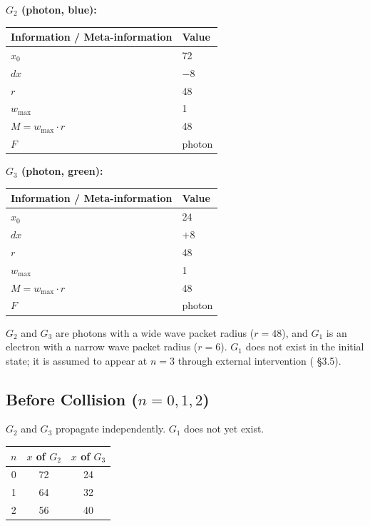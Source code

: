 \documentclass[12pt,a4paper]{article}
\begin{document}
\textbf{$G_2$ (photon, blue):}

\begin{table}[h]
\centering
\begin{tabular}{@{}ll@{}}
\toprule
Information / Meta-information & Value \\
\midrule
$x_0$ & 72 \\
$dx$ & $-8$ \\
$r$ & 48 \\
$w_{\max}$ & 1 \\
$M = w_{\max} \cdot r$ & 48 \\
$F$ & photon \\
\bottomrule
\end{tabular}
\end{table}

\textbf{$G_3$ (photon, green):}

\begin{table}[h]
\centering
\begin{tabular}{@{}ll@{}}
\toprule
Information / Meta-information & Value \\
\midrule
$x_0$ & 24 \\
$dx$ & $+8$ \\
$r$ & 48 \\
$w_{\max}$ & 1 \\
$M = w_{\max} \cdot r$ & 48 \\
$F$ & photon \\
\bottomrule
\end{tabular}
\end{table}

$G_2$ and $G_3$ are photons with a wide wave packet radius ($r = 48$), and $G_1$ is an electron with a narrow wave packet radius ($r = 6$). $G_1$ does not exist in the initial state; it is assumed to appear at $n = 3$ through external intervention (\cite{ref2} \S3.5).

\subsection{Before Collision ($n = 0, 1, 2$)}

$G_2$ and $G_3$ propagate independently. $G_1$ does not yet exist.

\begin{table}[h]
\centering
\begin{tabular}{@{}ccc@{}}
\toprule
$n$ & $x$ of $G_2$ & $x$ of $G_3$ \\
\midrule
0 & 72 & 24 \\
1 & 64 & 32 \\
2 & 56 & 40 \\
\bottomrule
\end{tabular}
\end{table}
\end{document}
